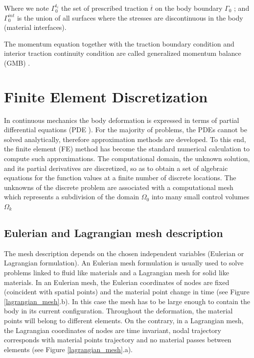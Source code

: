 Where we note $\Gamma_0^{t_i}$ the set of prescribed traction  $\overline{t}$ on the body boundary $\Gamma_0$ ; and $\Gamma_0^{int}$ is the union of all surfaces where the stresses are discontinuous in the body (material interfaces).

The momentum equation together with the traction boundary condition and interior traction continuity condition are called generalized momentum balance (GMB) .
\section{Finite Element Discretization}

\label{section:lagrangianmesh}
In continuous mechanics the body deformation is expressed in terms of partial differential equations (PDE ). For the majority of problems, the PDEs cannot be solved analytically, therefore approximation methods are developed. To this end, the finite element (FE) method has become the standard numerical calculation to compute such approximations. The computational domain, the unknown solution, and its partial derivatives are discretized, so as to obtain a set of algebraic equations for the function values at a finite number of discrete locations. The unknowns of the discrete problem are
associated with a computational mesh which represents a subdivision of the domain $\Omega_0$ into many small control volumes $\Omega_k$

\subsection{Eulerian and Lagrangian mesh description}

The mesh description depends on the chosen independent variables (Eulerian or Lagrangian formulation). An Eulerian mesh formulation is usually used to solve problems linked to fluid like materials and a Lagrangian mesh for solid like materials. In an Eulerian mesh, the Eulerian coordinates of nodes are fixed (coincident with spatial points) and the material point change in time (see Figure \ref{lagrangian_mesh}.b). In this case the mesh has to be large enough to contain the body in its current configuration. Throughout the deformation, the material points will belong to different elements. On the contrary, in a Lagrangian mesh, the Lagrangian coordinates of nodes are time invariant, nodal trajectory corresponds with material points trajectory and no material passes between elements (see Figure \ref{lagrangian_mesh}.a). 

